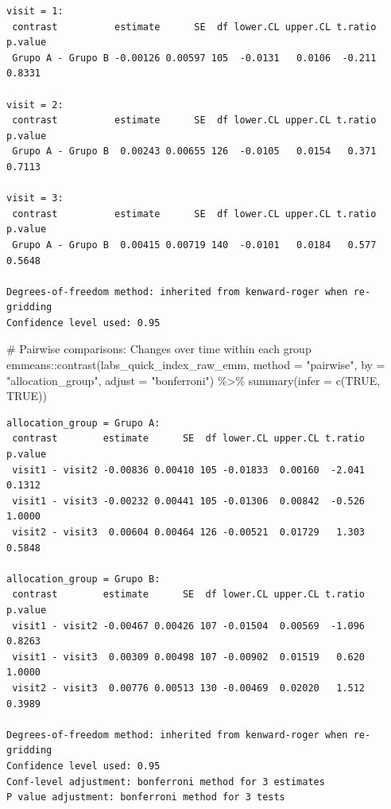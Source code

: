 \documentclass[
  12pt,
]{article}
\newenvironment{Shaded}{\begin{snugshade}}{\end{snugshade}}
\newcommand{\AttributeTok}[1]{\textcolor[rgb]{0.40,0.45,0.13}{#1}}
\newcommand{\CommentTok}[1]{\textcolor[rgb]{0.37,0.37,0.37}{#1}}
\newcommand{\ConstantTok}[1]{\textcolor[rgb]{0.56,0.35,0.01}{#1}}
\newcommand{\FunctionTok}[1]{\textcolor[rgb]{0.28,0.35,0.67}{#1}}
\newcommand{\NormalTok}[1]{\textcolor[rgb]{0.00,0.23,0.31}{#1}}
\newcommand{\SpecialCharTok}[1]{\textcolor[rgb]{0.37,0.37,0.37}{#1}}
\newcommand{\StringTok}[1]{\textcolor[rgb]{0.13,0.47,0.30}{#1}}
\begin{document}
\begin{verbatim}
visit = 1:
 contrast          estimate      SE  df lower.CL upper.CL t.ratio p.value
 Grupo A - Grupo B -0.00126 0.00597 105  -0.0131   0.0106  -0.211  0.8331

visit = 2:
 contrast          estimate      SE  df lower.CL upper.CL t.ratio p.value
 Grupo A - Grupo B  0.00243 0.00655 126  -0.0105   0.0154   0.371  0.7113

visit = 3:
 contrast          estimate      SE  df lower.CL upper.CL t.ratio p.value
 Grupo A - Grupo B  0.00415 0.00719 140  -0.0101   0.0184   0.577  0.5648

Degrees-of-freedom method: inherited from kenward-roger when re-gridding 
Confidence level used: 0.95 
\end{verbatim}

\begin{Shaded}
\begin{Highlighting}[]
\CommentTok{\# Pairwise comparisons: Changes over time within each group}
\NormalTok{emmeans}\SpecialCharTok{::}\FunctionTok{contrast}\NormalTok{(labs\_quick\_index\_raw\_emm,}
\AttributeTok{method =} \StringTok{"pairwise"}\NormalTok{, }\AttributeTok{by =} \StringTok{"allocation\_group"}\NormalTok{,}
\AttributeTok{adjust =} \StringTok{"bonferroni"}\NormalTok{) }\SpecialCharTok{\%\textgreater{}\%} \FunctionTok{summary}\NormalTok{(}\AttributeTok{infer =} \FunctionTok{c}\NormalTok{(}\ConstantTok{TRUE}\NormalTok{, }\ConstantTok{TRUE}\NormalTok{))}
\end{Highlighting}
\end{Shaded}

\begin{verbatim}
allocation_group = Grupo A:
 contrast        estimate      SE  df lower.CL upper.CL t.ratio p.value
 visit1 - visit2 -0.00836 0.00410 105 -0.01833  0.00160  -2.041  0.1312
 visit1 - visit3 -0.00232 0.00441 105 -0.01306  0.00842  -0.526  1.0000
 visit2 - visit3  0.00604 0.00464 126 -0.00521  0.01729   1.303  0.5848

allocation_group = Grupo B:
 contrast        estimate      SE  df lower.CL upper.CL t.ratio p.value
 visit1 - visit2 -0.00467 0.00426 107 -0.01504  0.00569  -1.096  0.8263
 visit1 - visit3  0.00309 0.00498 107 -0.00902  0.01519   0.620  1.0000
 visit2 - visit3  0.00776 0.00513 130 -0.00469  0.02020   1.512  0.3989

Degrees-of-freedom method: inherited from kenward-roger when re-gridding 
Confidence level used: 0.95 
Conf-level adjustment: bonferroni method for 3 estimates 
P value adjustment: bonferroni method for 3 tests 
\end{verbatim}
\end{document}
